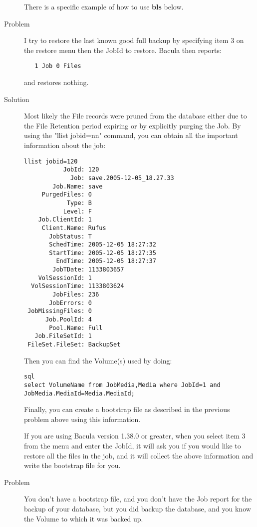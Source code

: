 \begin{description}
   There is a specific example of how to use {\bf bls} below.

\item [Problem]
   I try to restore the last known good full backup by specifying
   item 3 on the restore menu then the JobId to restore.  Bacula 
   then reports:

\footnotesize
\begin{verbatim}
   1 Job 0 Files
\end{verbatim}
\normalsize
   and restores nothing.

\item[Solution]
   Most likely the File records were pruned from the database either due
   to the File Retention period expiring or by explicitly purging the
   Job. By using the "llist jobid=nn" command, you can obtain all the
   important information about the job:

\footnotesize
\begin{verbatim}
llist jobid=120
           JobId: 120
             Job: save.2005-12-05_18.27.33
        Job.Name: save
     PurgedFiles: 0
            Type: B
           Level: F
    Job.ClientId: 1
     Client.Name: Rufus
       JobStatus: T
       SchedTime: 2005-12-05 18:27:32
       StartTime: 2005-12-05 18:27:35
         EndTime: 2005-12-05 18:27:37
        JobTDate: 1133803657
    VolSessionId: 1
  VolSessionTime: 1133803624
        JobFiles: 236
       JobErrors: 0
 JobMissingFiles: 0
      Job.PoolId: 4
       Pool.Name: Full
   Job.FileSetId: 1
 FileSet.FileSet: BackupSet
\end{verbatim}
\normalsize

   Then you can find the Volume(s) used by doing:

\footnotesize
\begin{verbatim}
sql
select VolumeName from JobMedia,Media where JobId=1 and JobMedia.MediaId=Media.MediaId;
\end{verbatim}
\normalsize

   Finally, you can create a bootstrap file as described in the previous
   problem above using this information.

   If you are using Bacula version 1.38.0 or greater, when you select
   item 3 from the menu and enter the JobId, it will ask you if
   you would like to restore all the files in the job, and it will
   collect the above information and write the bootstrap file for
   you.

\item [Problem]
  You don't have a bootstrap file, and you don't have the Job report for
  the backup of your database, but you did backup the database, and you
  know the Volume to which it was backed up.
  

\end{description}
